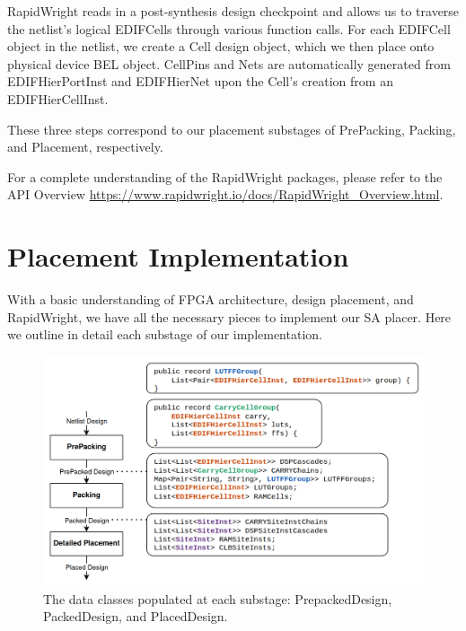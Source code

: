 \documentclass[twocolumn]{article}
\begin{document}
    
    RapidWright reads in a post-synthesis design checkpoint and allows us to traverse the netlist's logical EDIFCells through various function calls. 
    For each EDIFCell object in the netlist, we create a Cell design object, which we then place onto physical device BEL object. 
    CellPins and Nets are automatically generated from EDIFHierPortInst and EDIFHierNet upon the Cell's creation from an EDIFHierCellInst. 

    These three steps correspond to our placement substages of PrePacking, Packing, and Placement, respectively.

    For a complete understanding of the RapidWright packages, please refer to the API Overview \url{https://www.rapidwright.io/docs/RapidWright_Overview.html}.


\section{Placement Implementation}

    With a basic understanding of FPGA architecture, design placement, and RapidWright, we have all the necessary pieces to implement our SA placer. 
    Here we outline in detail each substage of our implementation. 

    \begin{figure}[t]
        \centering
        \includegraphics[width=14.0cm]{figures/substages.png}
        \caption{The data classes populated at each substage: PrepackedDesign, PackedDesign, and PlacedDesign.}
        \label{fig:substages}
    \end{figure}
\end{document}
